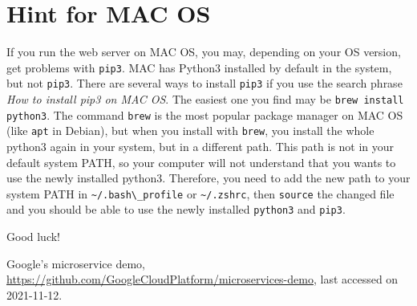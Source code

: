 \documentclass{article}
\begin{document}
\section{Hint for MAC OS}
\label{sec:mac}
If you run the web server on MAC OS, you may, depending on your OS version, get problems with \verb!pip3!. MAC has Python3 installed by default in the system, but not \verb!pip3!. There are several ways to install \verb!pip3! if you use the search phrase \textit{How to install pip3 on MAC OS}. The easiest one you find may be \verb!brew install python3!. The command \verb!brew! is the most popular package manager on MAC OS (like \verb!apt! in Debian), but when you install with \verb!brew!, you install the whole python3 again in your system, but in a different path. This path is not in your default system PATH, so your computer will not understand that you wants to use the newly installed python3. Therefore, you need to add the new path to your system PATH in \verb!~/.bash\_profile! or \verb!~/.zshrc!, then \verb!source! the changed file and you should be able to use the newly installed \verb!python3! and \verb!pip3!.

\vspace{1cm}
\begin{center}
\huge Good luck!
\end{center}

\begin{thebibliography}{10}


 Google's microservice demo, \url{https://github.com/GoogleCloudPlatform/microservices-demo}, last accessed on 2021-11-12.




\end{thebibliography}
\end{document}
